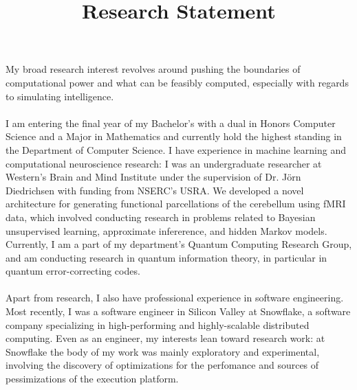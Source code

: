 \documentclass[11pt,a4paper,sans]{moderncv} %
\title{Research Statement}
\begin{document}
\makecvtitle %

My broad research interest revolves around pushing the boundaries of computational power and what can be feasibly computed, especially with regards to simulating intelligence.
\\\\
I am entering the final year of my Bachelor's with a dual in Honors Computer Science and a Major in Mathematics and currently hold the highest standing in the Department of Computer Science. I have experience in machine learning and computational neuroscience research: I was an undergraduate researcher at Western's Brain and Mind Institute under the supervision of Dr. Jörn Diedrichsen with funding from NSERC's USRA. We developed a novel architecture for generating functional parcellations of the cerebellum using fMRI data, which involved conducting research in problems related to Bayesian unsupervised learning, approximate infererence, and hidden Markov models. Currently, I am a part of my department's Quantum Computing Research Group, and am conducting research in quantum information theory, in particular in quantum error-correcting codes.
\\\\
Apart from research, I also have professional experience in software engineering. Most recently, I was a software engineer in Silicon Valley at Snowflake, a software company specializing in high-performing and highly-scalable distributed computing. Even as an engineer, my interests lean toward research work: at Snowflake the body of my work was mainly exploratory and experimental, involving the discovery of optimizations for the perfomance and sources of pessimizations of the execution platform.
\end{document}
